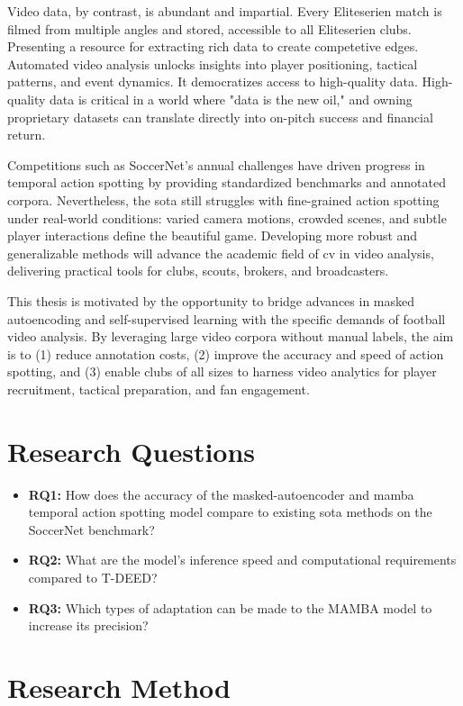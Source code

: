 Video data, by contrast, is abundant and impartial. Every Eliteserien match is filmed from multiple angles and stored, accessible to all Eliteserien clubs. Presenting a resource for extracting rich data to create competetive edges. Automated video analysis unlocks insights into player positioning, tactical patterns, and event dynamics. It democratizes access to high-quality data. High-quality data is critical in a world where "data is the new oil," and owning proprietary datasets can translate directly into on-pitch success and financial return.  

Competitions such as SoccerNet's annual challenges have driven progress in temporal action spotting by providing standardized benchmarks and annotated corpora. Nevertheless, the \acrlong{sota} still struggles with fine-grained action spotting under real-world conditions: varied camera motions, crowded scenes, and subtle player interactions define the beautiful game. Developing more robust and generalizable methods will advance the academic field of \acrshort{cv} in video analysis, delivering practical tools for clubs, scouts, brokers, and broadcasters.  

This thesis is motivated by the opportunity to bridge advances in masked autoencoding and self-supervised learning with the specific demands of football video analysis. By leveraging large video corpora without manual labels, the aim is to (1) reduce annotation costs, (2) improve the accuracy and speed of action spotting, and (3) enable clubs of all sizes to harness video analytics for player recruitment, tactical preparation, and fan engagement.  

\section{Research Questions}
\label{sec:research_questions}
\begin{itemize}
    \item \textbf{RQ1:} How does the accuracy of the masked-autoencoder and mamba temporal action spotting model compare to existing \acrlong{sota} methods on the SoccerNet benchmark?
    \item \textbf{RQ2:} What are the model's inference speed and computational requirements compared to T-DEED?
    \item \textbf{RQ3:} Which types of adaptation can be made to the MAMBA model to increase its precision?
\end{itemize}

\section{Research Method}


